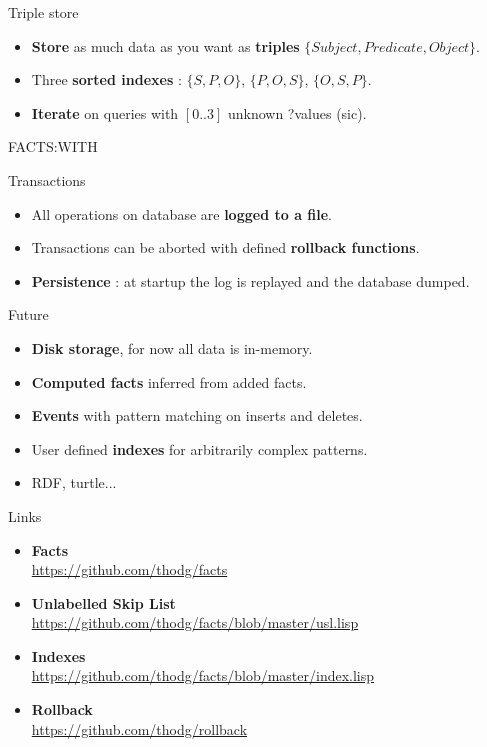 \documentclass{beamer}
\begin{document}
\begin{frame}
  Triple store
  \begin{itemize}
  \item {\bf Store} as much data as you want as {\bf triples} $\{Subject, Predicate, Object\}$.
  \item Three {\bf sorted indexes} : $\{S, P, O\}$, $\{P, O, S\}$, $\{O, S, P\}$.
  \item {\bf Iterate} on queries with $[0..3]$ unknown ?values (sic).
  \end{itemize}
\end{frame}

\begin{frame}
  FACTS:WITH
  \medskip
  {\small
    
  }
\end{frame}
    
\begin{frame}
  Transactions
  \begin{itemize}
  \item All operations on database are {\bf logged to a file}.
  \item Transactions can be aborted with defined {\bf rollback functions}.
  \item {\bf Persistence} : at startup the log is replayed and the database dumped.
  \end{itemize}
\end{frame}

\begin{frame}
  Future
  \begin{itemize}
  \item {\bf Disk storage}, for now all data is in-memory.
  \item {\bf Computed facts} inferred from added facts.
  \item {\bf Events} with pattern matching on inserts and deletes.
  \item User defined {\bf indexes} for arbitrarily complex patterns.
  \item RDF, turtle...
  \end{itemize}
\end{frame}

\begin{frame}
  Links
  \begin{itemize}
  \item {\bf Facts}\\
    \url{https://github.com/thodg/facts}
  \item {\bf Unlabelled Skip List}\\
    \url{https://github.com/thodg/facts/blob/master/usl.lisp}
  \item {\bf Indexes}\\
    \url{https://github.com/thodg/facts/blob/master/index.lisp}
  \item {\bf Rollback}\\
    \url{https://github.com/thodg/rollback}
  \end{itemize}
\end{frame}
\end{document}
